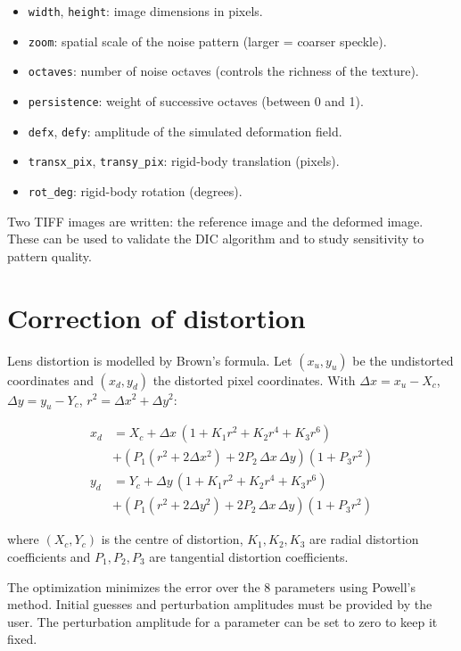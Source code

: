 \documentclass{simpledoc}
\newcommand{\scr}[1]{\texttt{\color{myblue}#1}}
\begin{document}
\begin{itemize}
  \item \scr{width}, \scr{height}: image dimensions in pixels.
  \item \scr{zoom}: spatial scale of the noise pattern (larger = coarser speckle).
  \item \scr{octaves}: number of noise octaves (controls the richness of the texture).
  \item \scr{persistence}: weight of successive octaves (between 0 and 1).
  \item \scr{defx}, \scr{defy}: amplitude of the simulated deformation field.
  \item \scr{transx\_pix}, \scr{transy\_pix}: rigid-body translation (pixels).
  \item \scr{rot\_deg}: rigid-body rotation (degrees).
\end{itemize}

Two TIFF images are written: the reference image and the deformed image.
These can be used to validate the DIC algorithm and to study sensitivity to pattern quality.

\section{Correction of distortion}
\label{sec:disto}

Lens distortion is modelled by Brown's formula.
Let $(x_u, y_u)$ be the undistorted coordinates and $(x_d, y_d)$ the distorted pixel coordinates.
With $\Delta x = x_u - X_c$, $\Delta y = y_u - Y_c$, $r^2 = \Delta x^2 + \Delta y^2$:

\begin{align}
\nonumber
x_d &= X_c + \Delta x\,(1 + K_1 r^2 + K_2 r^4 + K_3 r^6) \\ 
    &+
       (P_1(r^2 + 2\Delta x^2) + 2P_2\,\Delta x\,\Delta y)(1 + P_3 r^2) \\
\nonumber
y_d &= Y_c + \Delta y\,(1 + K_1 r^2 + K_2 r^4 + K_3 r^6) \\
    &+
       (P_1(r^2 + 2\Delta y^2) + 2P_2\,\Delta x\,\Delta y)(1 + P_3 r^2)
\end{align}

where $(X_c, Y_c)$ is the centre of distortion, $K_1, K_2, K_3$ are radial distortion
coefficients and $P_1, P_2, P_3$ are tangential distortion coefficients.

The optimization minimizes the error over the 8 parameters using Powell's method.
Initial guesses and perturbation amplitudes must be provided by the user.
The perturbation amplitude for a parameter can be set to zero to keep it fixed.
\end{document}
